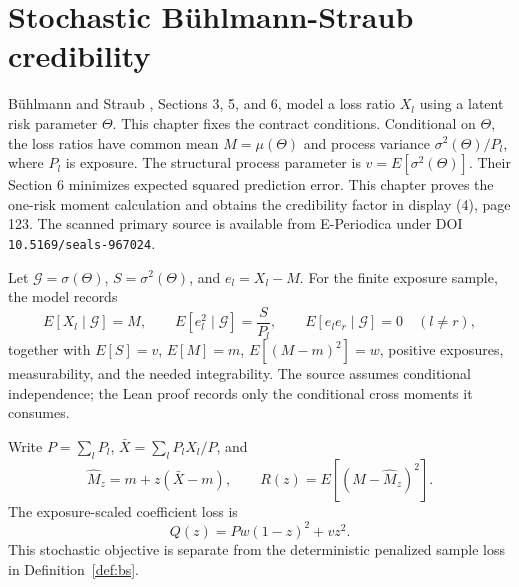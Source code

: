 \chapter{Stochastic Bühlmann-Straub credibility}

Bühlmann and Straub \cite{BuhlmannStraub1970}, Sections 3, 5, and 6, model a loss ratio $X_l$
using a latent risk parameter $\Theta$. This chapter fixes the contract
conditions. Conditional on $\Theta$, the loss
ratios have common mean $M=\mu(\Theta)$ and process variance
$\sigma^2(\Theta)/P_l$, where $P_l$ is exposure. The structural process
parameter is $v=E[\sigma^2(\Theta)]$. Their Section 6 minimizes expected squared prediction
error. This chapter proves the one-risk moment calculation and obtains the
credibility factor in display (4), page 123. The scanned primary source is
available from E-Periodica under DOI \texttt{10.5169/seals-967024}.

\begin{definition}\label{def:bsStochastic}\leanok
Let $\mathcal G=\sigma(\Theta)$, $S=\sigma^2(\Theta)$, and $e_l=X_l-M$.
For the finite exposure
sample, the model records
\[
  E[X_l\mid\mathcal G]=M,\qquad
  E[e_l^2\mid\mathcal G]=\frac S{P_l},\qquad
  E[e_le_r\mid\mathcal G]=0\quad(l\ne r),
\]
together with $E[S]=v$, $E[M]=m$, $E[(M-m)^2]=w$, positive exposures,
measurability, and the needed integrability. The source assumes conditional independence; the
Lean proof records only the conditional cross moments it consumes.
\end{definition}

\begin{definition}\label{def:bsRisk}\leanok
Write $P=\sum_lP_l$, $\bar X=\sum_lP_lX_l/P$, and
\[
  \widehat M_z=m+z(\bar X-m),\qquad
  R(z)=E[(M-\widehat M_z)^2].
\]
The exposure-scaled coefficient loss is
\[
  Q(z)=Pw(1-z)^2+vz^2.
\]
This stochastic objective is separate from the deterministic penalized sample
loss in Definition~\ref{def:bs}.
\end{definition}


